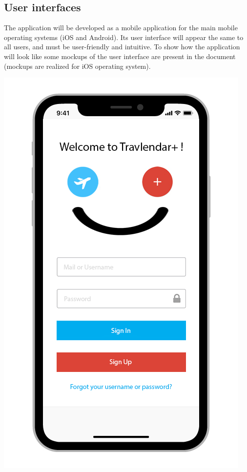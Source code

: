 \subsection{User interfaces}
The application will be developed as a mobile application for the main mobile operating systems (iOS and Android).
Its user interface will appear the same to all users, and must be user-friendly and intuitive. To show how the application will look like some mockups of the user interface are present in the document (mockups are realized for iOS operating system).
\begin{center}
\includegraphics[scale=2.4]{MainMatter/images/ui/login}
\end{center}
